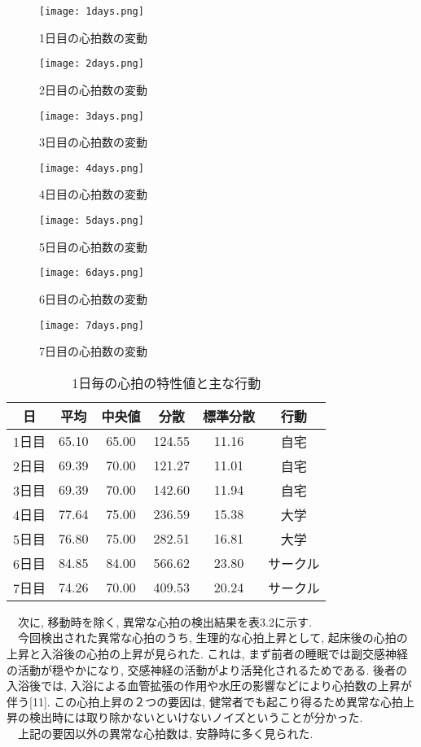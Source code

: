 \documentclass[report, 11pt, a4paper]{jsbook}
\begin{document}
\begin{figure}[H]
\centering
\texttt{[image: 1days.png]}
\caption{1日目の心拍数の変動}
\texttt{[image: 2days.png]}
\caption{2日目の心拍数の変動}
\texttt{[image: 3days.png]}
\caption{3日目の心拍数の変動}
\label{fig:goolge_trends}
\end{figure}

\begin{figure}[H]
\centering
\texttt{[image: 4days.png]}
\caption{4日目の心拍数の変動}
\texttt{[image: 5days.png]}
\caption{5日目の心拍数の変動}
\texttt{[image: 6days.png]}
\caption{6日目の心拍数の変動}
\label{fig:goolge_trends}
\end{figure}

\begin{figure}[H]
\centering
\texttt{[image: 7days.png]}
\caption{7日目の心拍数の変動}
\label{fig:goolge_trends}
\end{figure}

\begin{table}[H]
\centering
\caption{1日毎の心拍の特性値と主な行動}
\begin{tabular}{cccccc}
\hline
日  & 平均    & 中央値   & 分散     & 標準分散  & 行動   \\ \hline
1日目 & 65.10 & 65.00 & 124.55 & 11.16 & 自宅   \\
2日目 & 69.39 & 70.00 & 121.27 & 11.01 & 自宅   \\
3日目 & 69.39 & 70.00 & 142.60 & 11.94 & 自宅   \\
4日目 & 77.64 & 75.00 & 236.59 & 15.38 & 大学   \\
5日目 & 76.80 & 75.00 & 282.51 & 16.81 & 大学   \\
6日目 & 84.85 & 84.00 & 566.62 & 23.80 & サークル \\
7日目 & 74.26 & 70.00 & 409.53 & 20.24 & サークル \\ \hline
\end{tabular}
\end{table}

　次に, 移動時を除く, 異常な心拍の検出結果を表3.2に示す. \\
　今回検出された異常な心拍のうち, 生理的な心拍上昇として, 起床後の心拍の上昇と入浴後の心拍の上昇が見られた. これは, まず前者の睡眠では副交感神経の活動が穏やかになり, 交感神経の活動がより活発化されるためである. 後者の入浴後では, 入浴による血管拡張の作用や水圧の影響などにより心拍数の上昇が伴う[11]. この心拍上昇の２つの要因は, 健常者でも起こり得るため異常な心拍上昇の検出時には取り除かないといけないノイズということが分かった. \\
　上記の要因以外の異常な心拍数は, 安静時に多く見られた. 
\end{document}
